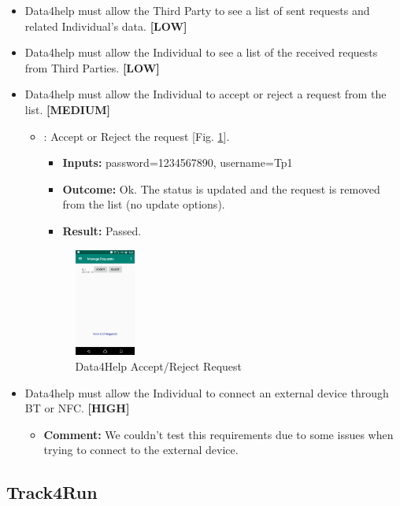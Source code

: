 \documentclass[a4paper, hidelinks, 12pt]{report}
\newcommand\requirement[1]{\item[{[REQ-#1]}] }
\newcommand\test[1]{\item[{[TEST-#1]}] }
\begin{document}
\begin{itemize}
\begin{itemize}
	\end{itemize}

	\requirement{14} Data4help must allow the Third Party to see a list of sent requests and related Individual’s data. \textbf{[LOW]}
	\requirement{15} Data4help must allow the Individual to see a list of the received requests from Third Parties. \textbf{[LOW]}
	\requirement{16} Data4help must allow the Individual to accept or reject a request from the list. \textbf{[MEDIUM]}
			
				\begin{itemize}
		\test{13}: Accept or Reject the request [Fig. \ref{fig:request_acceptreject}].
			\begin{itemize}
			\item \textbf{Inputs: } password=1234567890, username=Tp1			
			\item \textbf{Outcome: } Ok. The status is updated and the request is removed from the list (no update options).
			\item \textbf{Result: } Passed. 
			\end{itemize}		
			
		\begin{figure}[H]
					\centering
				\includegraphics[width=0.2\textwidth]{images/manage_requests.jpeg}
					\caption[Data4Help Accept/Reject Request]{Data4Help Accept/Reject Request}
				\label{fig:request_acceptreject}
			\end{figure}

	\end{itemize}
	
	\requirement{17} Data4help must allow the Individual to connect an external device through BT or NFC. \textbf{[HIGH]}
	\begin{itemize}
		\item \textbf{Comment: } We couldn't test this requirements due to some issues when trying to connect to the external device.
	\end{itemize}
	
	
	\end{itemize}
	\subsection{Track4Run}
	
\end{document}
